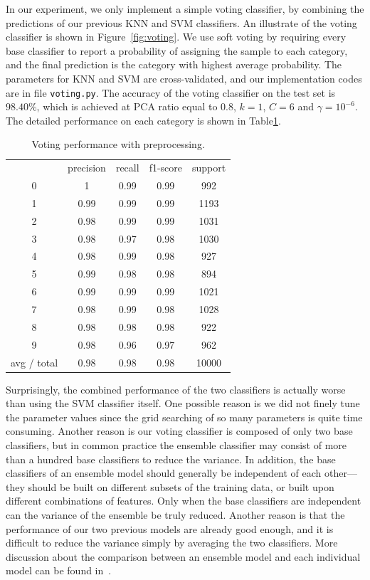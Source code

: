 \documentclass{article}
\begin{document}
In our experiment, we only implement a simple voting classifier, by combining the predictions of our previous KNN and SVM classifiers. An illustrate of the voting classifier is shown in Figure~\ref{fig:voting}. We use soft voting by requiring every base classifier to report a probability of assigning the sample to each category, and the final prediction is the category with highest average probability. The parameters for KNN and SVM are cross-validated, and our implementation codes are in file \texttt{voting.py}. The accuracy of the voting classifier on the test set is $98.40\%$, which is achieved at PCA ratio equal to $0.8$, $k=1$, $C=6$ and $\gamma = 10^{-6}$. The detailed performance on each category is shown in Table\ref{tbl:voting}.

\begin{table}[!htb]
	\centering
	\small 
	\caption{Voting performance with preprocessing.}
	\begin{tabular}{ccccc}
		& precision & recall & f1-score & support \\
		0     & 1     & 0.99  & 0.99  & 992 \\
		1     & 0.99  & 0.99  & 0.99  & 1193 \\
		2     & 0.98  & 0.99  & 0.99  & 1031 \\
		3     & 0.98  & 0.97  & 0.98  & 1030 \\
		4     & 0.98  & 0.99  & 0.98  & 927 \\
		5     & 0.99  & 0.98  & 0.98  & 894 \\
		6     & 0.99  & 0.99  & 0.99  & 1021 \\
		7     & 0.98  & 0.99  & 0.98  & 1028 \\
		8     & 0.98  & 0.98  & 0.98  & 922 \\
		9     & 0.98  & 0.96  & 0.97  & 962 \\
		avg / total & 0.98  & 0.98  & 0.98  & 10000 \\
	\end{tabular}%
	\label{tbl:voting}%
\end{table}%

Surprisingly, the combined performance of the two classifiers is actually worse than using the SVM classifier itself. One possible reason is we did not finely tune the parameter values since the grid searching of so many parameters is quite time consuming. Another reason is our voting classifier is composed of only two base classifiers, but in common practice the ensemble classifier may consist of more than a hundred base classifiers to reduce the variance. In addition, the base classifiers of an ensemble model should generally be independent of each other---they should be built on different subsets of the training data, or built upon different combinations of features. Only when the base classifiers are independent can the variance of the ensemble be truly reduced. Another reason is that the performance of our two previous models are already good enough, and it is difficult to reduce the variance simply by averaging the two classifiers. More discussion about the comparison between an ensemble model and each individual model can be found in~\cite{dvzeroski2004combining}. 
\end{document}
